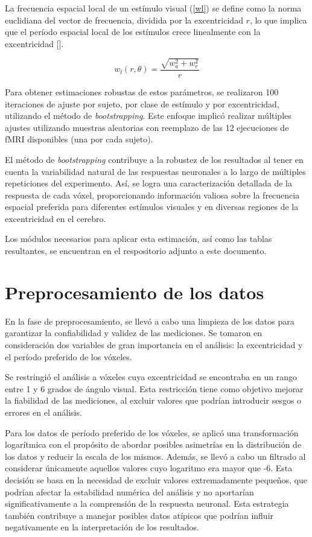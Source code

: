 La frecuencia espacial local de un est\'imulo visual (\ref{wl}) se define como la norma euclidiana del vector de frecuencia, dividida por la excentricidad  $r$, lo que implica que el período espacial local de los estímulos crece linealmente con la excentricidad [\cite{broderick_mapping_2022}].

\begin{equation}
	w_l(r,\theta) = \dfrac{\sqrt{w_a^2 + w_r^2}}{r} 
	\label{wl}
\end{equation}

Para obtener estimaciones robustas de estos parámetros, se realizaron 100 iteraciones de ajuste por sujeto, por clase de estímulo y por excentricidad, utilizando el método de \textit{bootstrapping}. Este enfoque implicó realizar múltiples ajustes utilizando muestras aleatorias con reemplazo de las 12 ejecuciones de fMRI disponibles (una por cada sujeto).

El método de \textit{bootstrapping} contribuye a la robustez de los resultados al tener en cuenta la variabilidad natural de las respuestas neuronales a lo largo de múltiples repeticiones del experimento. Así, se logra una caracterización detallada de la respuesta de cada v\'oxel, proporcionando información valiosa sobre la frecuencia espacial preferida para diferentes estímulos visuales y en diversas regiones de la excentricidad en el cerebro.

Los m\'odulos necesarios para aplicar esta estimaci\'on, as\'i como las tablas resultantes, se encuentran en el respositorio adjunto a este documento. 

\section{Preprocesamiento de los datos}

En la fase de preprocesamiento, se llevó a cabo una limpieza de los datos para garantizar la confiabilidad y validez de las mediciones. Se tomaron en consideración dos variables de gran importancia en el análisis: la excentricidad y el período preferido de los v\'oxeles.

Se restringi\'o el análisis a v\'oxeles cuya excentricidad se encontraba en un rango entre 1 y 6 grados de \'angulo visual. Esta restricción tiene como objetivo mejorar la fiabilidad de las mediciones, al excluir valores que podrían introducir sesgos o errores en el análisis.

Para los datos de período preferido de los v\'oxeles, se aplicó una transformación logarítmica con el propósito de abordar posibles asimetrías en la distribución de los datos y reducir la escala de los mismos. Además, se llevó a cabo un filtrado al considerar únicamente aquellos valores cuyo logaritmo era mayor que -6. Esta decisión se basa en la necesidad de excluir valores extremadamente pequeños, que podrían afectar la estabilidad numérica del análisis y no aportarían significativamente a la comprensión de la respuesta neuronal. Esta estrategia también contribuye a manejar posibles datos atípicos que podrían influir negativamente en la interpretación de los resultados.

